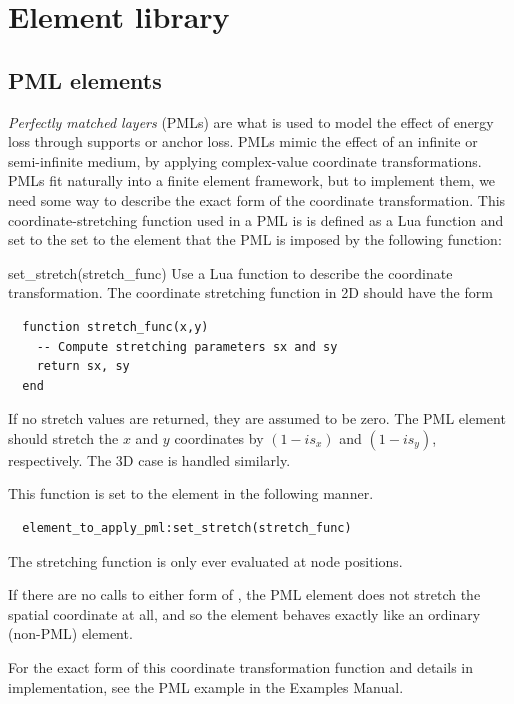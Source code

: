 \newpage
\section{Element library}
\label{section:ElementLibrary}
\subsection{PML elements}

\emph{Perfectly matched layers} (PMLs) are what is used to model
the effect of energy loss through supports or anchor loss.
PMLs mimic the effect of an infinite or semi-infinite medium,
by applying complex-value coordinate transformations.
PMLs fit naturally
into a finite element framework, but to implement them, we need some
way to describe the exact form of the coordinate transformation.
This coordinate-stretching function used in a PML is is defined as a
Lua function and set to the set to the element that
the PML is imposed by the following function:
\begin{codelist}

  \item[set\_stretch(stretch\_func)]
    Use a Lua function  to describe the coordinate 
    transformation.  
    The coordinate stretching function in 2D should have the form
    \begin{verbatim}
  function stretch_func(x,y)
    -- Compute stretching parameters sx and sy
    return sx, sy
  end
    \end{verbatim}
    If no stretch values are returned, they are assumed to be zero.
    The PML element should stretch the $x$ and $y$ coordinates by
    $(1-is_x)$ and $(1-is_y)$, respectively.  The 3D case is handled
    similarly.

    This function is set to the element in the following manner.
    \begin{verbatim}
  element_to_apply_pml:set_stretch(stretch_func)
    \end{verbatim}

    The stretching function is only ever evaluated at node positions.

\end{codelist}
If there are no calls to either form of , the PML
element does not stretch the spatial coordinate at all, and so the
element behaves exactly like an ordinary (non-PML) element.

For the exact form of this coordinate transformation function and
details in implementation, see the PML example in the Examples
Manual.

